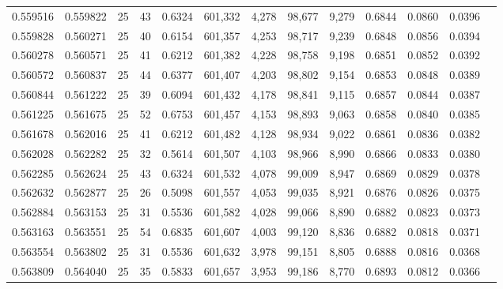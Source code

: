\begin{tabular}{rrrrrrrrrrrrr}
0.559516 & 0.559822 &    25 &  43 &                                     0.6324 & 601,332 &   4,278 &  98,677 &   9,279 & 0.6844 & 0.0860 & 0.0396 \\
0.559828 & 0.560271 &    25 &  40 &                                     0.6154 & 601,357 &   4,253 &  98,717 &   9,239 & 0.6848 & 0.0856 & 0.0394 \\
0.560278 & 0.560571 &    25 &  41 &                                     0.6212 & 601,382 &   4,228 &  98,758 &   9,198 & 0.6851 & 0.0852 & 0.0392 \\
0.560572 & 0.560837 &    25 &  44 &                                     0.6377 & 601,407 &   4,203 &  98,802 &   9,154 & 0.6853 & 0.0848 & 0.0389 \\
0.560844 & 0.561222 &    25 &  39 &                                     0.6094 & 601,432 &   4,178 &  98,841 &   9,115 & 0.6857 & 0.0844 & 0.0387 \\
0.561225 & 0.561675 &    25 &  52 &                                     0.6753 & 601,457 &   4,153 &  98,893 &   9,063 & 0.6858 & 0.0840 & 0.0385 \\
0.561678 & 0.562016 &    25 &  41 &                                     0.6212 & 601,482 &   4,128 &  98,934 &   9,022 & 0.6861 & 0.0836 & 0.0382 \\
0.562028 & 0.562282 &    25 &  32 &                                     0.5614 & 601,507 &   4,103 &  98,966 &   8,990 & 0.6866 & 0.0833 & 0.0380 \\
0.562285 & 0.562624 &    25 &  43 &                                     0.6324 & 601,532 &   4,078 &  99,009 &   8,947 & 0.6869 & 0.0829 & 0.0378 \\
0.562632 & 0.562877 &    25 &  26 &                                     0.5098 & 601,557 &   4,053 &  99,035 &   8,921 & 0.6876 & 0.0826 & 0.0375 \\
0.562884 & 0.563153 &    25 &  31 &                                     0.5536 & 601,582 &   4,028 &  99,066 &   8,890 & 0.6882 & 0.0823 & 0.0373 \\
0.563163 & 0.563551 &    25 &  54 &                                     0.6835 & 601,607 &   4,003 &  99,120 &   8,836 & 0.6882 & 0.0818 & 0.0371 \\
0.563554 & 0.563802 &    25 &  31 &                                     0.5536 & 601,632 &   3,978 &  99,151 &   8,805 & 0.6888 & 0.0816 & 0.0368 \\
0.563809 & 0.564040 &    25 &  35 &                                     0.5833 & 601,657 &   3,953 &  99,186 &   8,770 & 0.6893 & 0.0812 & 0.0366 \\

\end{tabular}
